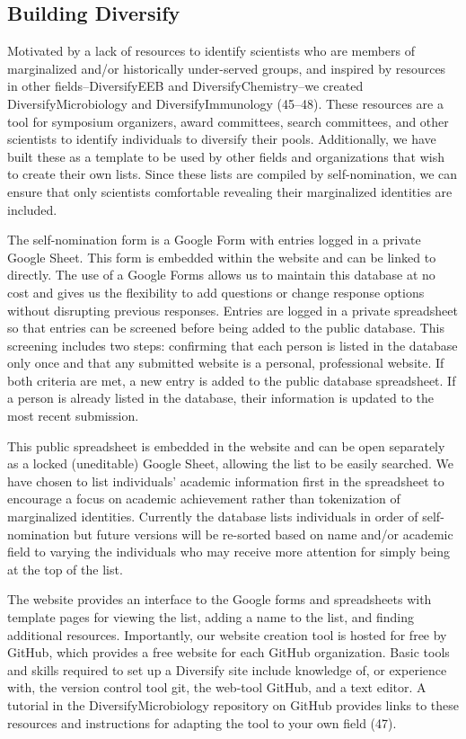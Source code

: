 \documentclass[10pt,]{article}
\begin{document}
\subsection{Building Diversify}\label{building-diversify}

Motivated by a lack of resources to identify scientists who are members
of marginalized and/or historically under-served groups, and inspired by
resources in other fields--DiversifyEEB and DiversifyChemistry--we
created DiversifyMicrobiology and DiversifyImmunology (45--48). These
resources are a tool for symposium organizers, award committees, search
committees, and other scientists to identify individuals to diversify
their pools. Additionally, we have built these as a template to be used
by other fields and organizations that wish to create their own lists.
Since these lists are compiled by self-nomination, we can ensure that
only scientists comfortable revealing their marginalized identities are
included.

The self-nomination form is a Google Form with entries logged in a
private Google Sheet. This form is embedded within the website and can
be linked to directly. The use of a Google Forms allows us to maintain
this database at no cost and gives us the flexibility to add questions
or change response options without disrupting previous responses.
Entries are logged in a private spreadsheet so that entries can be
screened before being added to the public database. This screening
includes two steps: confirming that each person is listed in the
database only once and that any submitted website is a personal,
professional website. If both criteria are met, a new entry is added to
the public database spreadsheet. If a person is already listed in the
database, their information is updated to the most recent submission.

This public spreadsheet is embedded in the website and can be open
separately as a locked (uneditable) Google Sheet, allowing the list to
be easily searched. We have chosen to list individuals' academic
information first in the spreadsheet to encourage a focus on academic
achievement rather than tokenization of marginalized identities.
Currently the database lists individuals in order of self-nomination but
future versions will be re-sorted based on name and/or academic field to
varying the individuals who may receive more attention for simply being
at the top of the list.

The website provides an interface to the Google forms and spreadsheets
with template pages for viewing the list, adding a name to the list, and
finding additional resources. Importantly, our website creation tool is
hosted for free by GitHub, which provides a free website for each GitHub
organization. Basic tools and skills required to set up a Diversify site
include knowledge of, or experience with, the version control tool git,
the web-tool GitHub, and a text editor. A tutorial in the
DiversifyMicrobiology repository on GitHub provides links to these
resources and instructions for adapting the tool to your own field (47).
\end{document}
